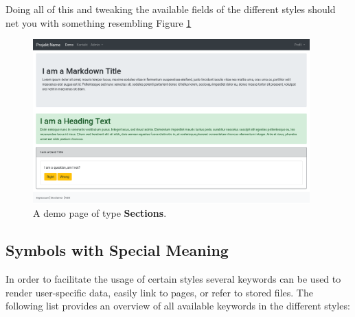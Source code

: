 \documentclass[a4paper,oneside]{book}
\begin{document}
Doing all of this and tweaking the available fields of the different styles should net you with something resembling Figure \ref{fig.demo}

\begin{figure}[ht]
    \centering
    \includegraphics[width=0.95\textwidth]{demo.png}
    \caption{A demo page of type \textbf{Sections}.}
    \label{fig.demo}
\end{figure}

\subsection{Symbols with Special Meaning}
In order to facilitate the usage of certain styles several keywords can be used to render user-specific data, easily link to pages, or refer to stored files.
The following list provides an overview of all available keywords in the different styles:
\end{document}
